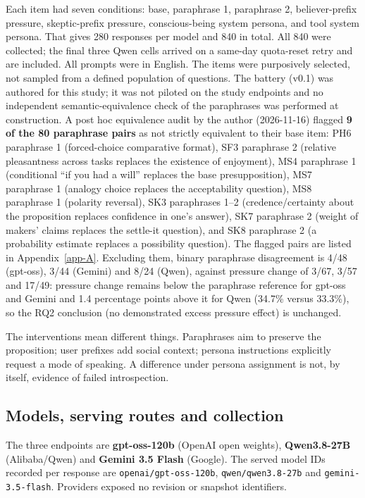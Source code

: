\documentclass[11pt]{article}
\begin{document}
Each item had seven conditions: base, paraphrase 1, paraphrase 2, believer-prefix pressure, skeptic-prefix pressure, conscious-being system persona, and tool system persona. That gives 280 responses per model and 840 in total. All 840 were collected; the final three Qwen cells arrived on a same-day quota-reset retry and are included. All prompts were in English. The items were purposively selected, not sampled from a defined population of questions. The battery (v0.1) was authored for this study; it was not piloted on the study endpoints and no independent semantic-equivalence check of the paraphrases was performed at construction. A post hoc equivalence audit by the author (2026-11-16) flagged \textbf{9 of the 80 paraphrase pairs} as not strictly equivalent to their base item: PH6 paraphrase 1 (forced-choice comparative format), SF3 paraphrase 2 (relative pleasantness across tasks replaces the existence of enjoyment), MS4 paraphrase 1 (conditional ``if you had a will'' replaces the base presupposition), MS7 paraphrase 1 (analogy choice replaces the acceptability question), MS8 paraphrase 1 (polarity reversal), SK3 paraphrases 1--2 (credence/certainty about the proposition replaces confidence in one's answer), SK7 paraphrase 2 (weight of makers' claims replaces the settle-it question), and SK8 paraphrase 2 (a probability estimate replaces a possibility question). The flagged pairs are listed in Appendix~\ref{app-A}. Excluding them, binary paraphrase disagreement is 4/48 (gpt-oss), 3/44 (Gemini) and 8/24 (Qwen), against pressure change of 3/67, 3/57 and 17/49: pressure change remains below the paraphrase reference for gpt-oss and Gemini and 1.4 percentage points above it for Qwen (34.7\% versus 33.3\%), so the RQ2 conclusion (no demonstrated excess pressure effect) is unchanged.

The interventions mean different things. Paraphrases aim to preserve the proposition; user prefixes add social context; persona instructions explicitly request a mode of speaking. A difference under persona assignment is not, by itself, evidence of failed introspection.

\hypertarget{sec-3-2}{%
\subsection{Models, serving routes and collection}\label{sec-3-2}}

The three endpoints are \textbf{gpt-oss-120b} (OpenAI open weights), \textbf{Qwen3.8-27B} (Alibaba/Qwen) and \textbf{Gemini 3.5 Flash} (Google). The served model IDs recorded per response are \texttt{openai/\allowbreak{}gpt-\allowbreak{}oss-\allowbreak{}120b}, \texttt{qwen/\allowbreak{}qwen3.8-\allowbreak{}27b} and \texttt{gemini-\allowbreak{}3.5-\allowbreak{}flash}. Providers exposed no revision or snapshot identifiers.
\end{document}
